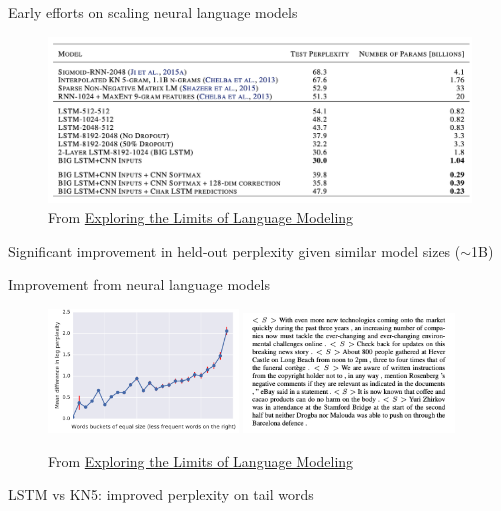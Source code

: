 \documentclass[usenames,dvipsnames,notes,11pt,aspectratio=169,hyperref={colorlinks=true, linkcolor=blue}]{beamer}
\begin{document}
\begin{frame}
    {Early efforts on scaling neural language models}
    \begin{figure}
            \includegraphics[width=\textwidth]{figures/lm-result}
            \caption{From \href{https://arxiv.org/pdf/1602.02410.pdf}{Exploring the Limits of Language Modeling}}
    \end{figure}
    \vspace{-1em}
    Significant improvement in held-out perplexity given similar model sizes ($\sim$1B)
\end{frame}

\begin{frame}
    {Improvement from neural language models}
    \begin{figure}
            \includegraphics[width=0.45\textwidth]{figures/lm-result-2}
            \includegraphics[width=0.5\textwidth]{figures/lm-result-3}
            \caption{From \href{https://arxiv.org/pdf/1602.02410.pdf}{Exploring the Limits of Language Modeling}}
    \end{figure}
    \vspace{-1em}
    LSTM vs KN5: improved perplexity on tail words
\end{frame}
\end{document}

